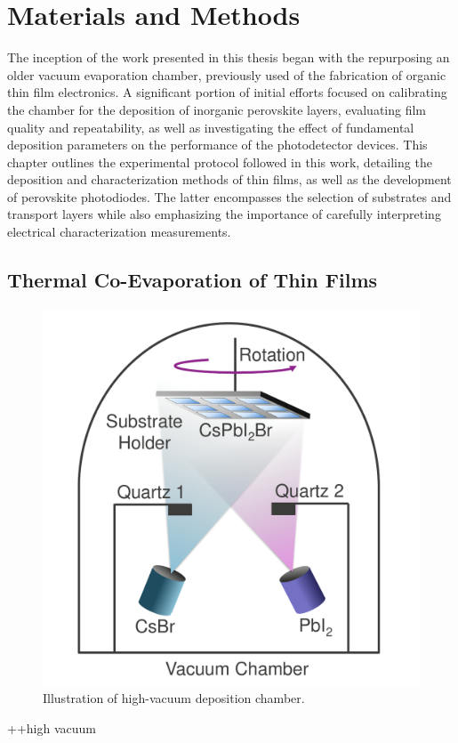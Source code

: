 \chapter{Materials and Methods}\label{ch:material_properties}

The inception of the work presented in this thesis began with the repurposing an older vacuum evaporation chamber, previously used of the fabrication of organic thin film electronics. A significant portion of initial efforts focused on calibrating the chamber for the deposition of inorganic perovskite layers, evaluating film quality and repeatability, as well as investigating the effect of fundamental deposition parameters on the performance of the photodetector devices. This chapter outlines the experimental protocol followed in this work, detailing the deposition and characterization methods of  thin films, as well as the development of perovskite photodiodes. The latter encompasses the selection of substrates and transport layers while also emphasizing the importance of carefully interpreting electrical characterization measurements.

\section{Thermal Co-Evaporation of  Thin Films}

\begin{figure}
  \centering
  \medskip
  \includegraphics[width=.5\textwidth]{chapters/material_properties/images/Chamber.pdf}
  \caption[Short caption for Table of Figures]{Illustration of high-vacuum deposition chamber.}
  \label{fig:deposition_chamber}
\end{figure}

++high vacuum 


